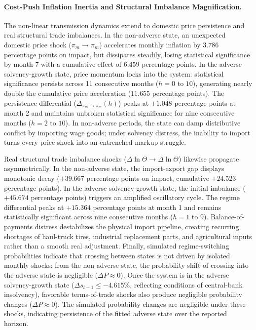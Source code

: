 \paragraph{Cost-Push Inflation Inertia and Structural Imbalance Magnification.}
The non-linear transmission dynamics extend to domestic price persistence and real structural trade imbalances. In the non-adverse state, an unexpected domestic price shock ($\pi_m \to \pi_m$) accelerates monthly inflation by $3.786$ percentage points on impact, but dissipates steadily, losing statistical significance by month 7 with a cumulative effect of $6.459$ percentage points. In the adverse solvency-growth state, price momentum locks into the system: statistical significance persists across 11 consecutive months ($h=0$ to $10$), generating nearly double the cumulative price acceleration ($11.655$ percentage points). The persistence differential ($\Delta_{\pi_m \to \pi_m}(h)$) peaks at $+1.048$ percentage points at month 2 and maintains unbroken statistical significance for nine consecutive months ($h=2$ to $10$). In non-adverse periods, the state can damp distributive conflict by importing wage goods; under solvency distress, the inability to import turns every price shock into an entrenched markup struggle.

Real structural trade imbalance shocks ($\Delta\ln\Theta \to \Delta\ln\Theta$) likewise propagate asymmetrically. In the non-adverse state, the import-export gap displays monotonic decay ($+39.667$ percentage points on impact, cumulative $+24.523$ percentage points). In the adverse solvency-growth state, the initial imbalance ($+45.674$ percentage points) triggers an amplified oscillatory cycle. The regime differential peaks at $+15.364$ percentage points at month 1 and remains statistically significant across nine consecutive months ($h=1$ to $9$). Balance-of-payments distress destabilizes the physical import pipeline, creating recurring shortages of haul-truck tires, industrial replacement parts, and agricultural inputs rather than a smooth real adjustment. Finally, simulated regime-switching probabilities indicate that crossing between states is not driven by isolated monthly shocks: from the non-adverse state, the probability shift of crossing into the adverse state is negligible ($\Delta P \approx 0$). Once the system is in the adverse solvency-growth state ($\Delta s_{t-1} \le -4.615\%$, reflecting conditions of central-bank insolvency), favorable terms-of-trade shocks also produce negligible probability changes ($\Delta P \approx 0$). The simulated probability changes are negligible under these shocks, indicating persistence of the fitted adverse state over the reported horizon.




